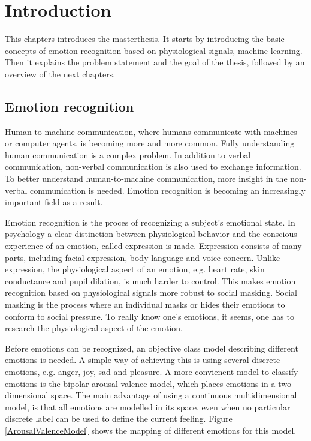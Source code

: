 \chapter{Introduction}
{\samenvatting This chapters introduces the masterthesis. It starts by introducing the basic concepts of emotion recognition based on physiological signals, machine learning. Then it explains the problem statement and the goal of the thesis, followed by an overview of the next chapters.}

\section{Emotion recognition}

Human-to-machine communication, where humans communicate with machines or computer agents, is becoming more and more common\citep{hummaccom}. Fully understanding human communication is a complex problem. In addition to verbal communication, non-verbal communication is also used to exchange information\citep{EmotionRelativePower}. To better understand human-to-machine communication, more insight in the non-verbal communication is needed. Emotion recognition is becoming an increasingly important field as a result\citep{RealTimeEEGEmotion}.

\npar 

Emotion recognition is the proces of recognizing a subject's emotional state. In psychology a clear distinction between physiological behavior and the conscious experience of an emotion, called expression\cite{ExtendedPaper} is made. Expression consists of many parts, including facial expression, body language and voice concern\citep{EMSpeech}. Unlike expression, the physiological aspect of an emotion, e.g. heart rate, skin conductance and pupil dilation, is much harder to control. This makes emotion recognition based on physiological signals more robust to social masking\citep{PhytoEm}. Social masking is the process where an individual masks or hides their emotions to conform to social pressure. To really know one's emotions, it seems, one has to research the physiological aspect of the emotion.

\npar

\label{valarrdomspace}
Before emotions can be recognized, an objective class model describing different emotions is needed. A simple way of achieving this is using several discrete emotions, e.g. anger, joy, sad and pleasure. A more convienent model to classify emotions is the bipolar arousal-valence model\cite{ExtendedPaper,RealTimeEEGEmotion}, which places emotions in a two dimensional space. The main advantage of using a continuous multidimensional model, is that all emotions are modelled in its space, even when no particular discrete label can be used to define the current feeling. Figure \ref{ArousalValenceModel} shows the mapping of different emotions for this model. 

